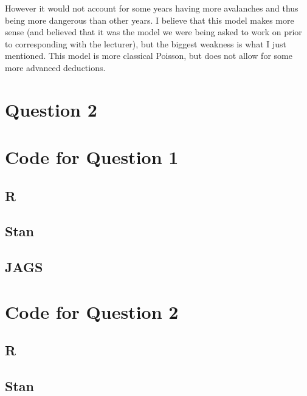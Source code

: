 \documentclass[10pt]{extarticle}
\begin{document}
However it would not account for some years having more avalanches and thus being more dangerous than other years. I believe that this model makes more sense (and believed that it was the model we were being asked to work on prior to corresponding with the lecturer), but the biggest weakness is what I just mentioned. This model is more classical Poisson, but does not allow for some more advanced deductions. 

\section*{Question 2}

\printbibliography

\newpage

\appendix

\section{Code for Question 1}
\subsection{R}
\label{code:main_1}
\subsection{Stan}
\label{code:stan_1}
\subsection{JAGS}
\label{code:jags_1}
\section{Code for Question 2}
\subsection{R}
\label{code:main_2}
\subsection{Stan}
\label{code:stan_2}
\end{document}
